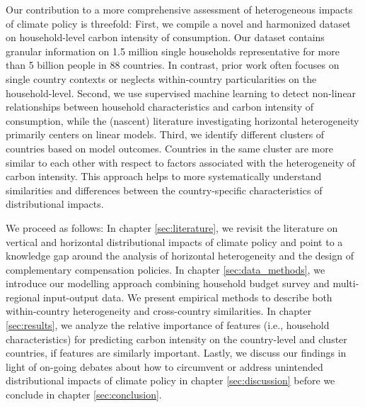 \documentclass[12pt, a4paper]{article}
\begin{document}
Our contribution to a more comprehensive assessment of heterogeneous impacts of climate policy is threefold: First, we compile a novel and harmonized dataset on household-level carbon intensity of consumption. Our dataset contains granular information on 1.5 million single households representative for more than 5 billion people in 88 countries. In contrast, prior work often focuses on single country contexts or neglects within-country particularities on the household-level. Second, we use supervised machine learning to detect non-linear relationships between household characteristics and carbon intensity of consumption, while the (nascent) literature investigating horizontal heterogeneity primarily centers on linear models. Third, we identify different clusters of countries based on model outcomes. Countries in the same cluster are more similar to each other with respect to factors associated with the heterogeneity of carbon intensity. This approach helps to more systematically understand similarities and differences between the country-specific characteristics of distributional impacts. %

We proceed as follows: In chapter \ref{sec:literature}, we revisit the literature on vertical and horizontal distributional impacts of climate policy and point to a knowledge gap around the analysis of horizontal heterogeneity and the design of complementary compensation policies. In chapter \ref{sec:data_methods}, we introduce our modelling approach combining household budget survey and multi-regional input-output data. We present empirical methods to describe both within-country heterogeneity and cross-country similarities. In chapter \ref{sec:results}, we analyze the relative importance of features (i.e., household characteristics) for predicting carbon intensity on the country-level and cluster countries, if features are similarly important. Lastly, we discuss our findings in light of on-going debates about how to circumvent or address unintended distributional impacts of climate policy in chapter \ref{sec:discussion} before we conclude in chapter \ref{sec:conclusion}.  

\end{document}
